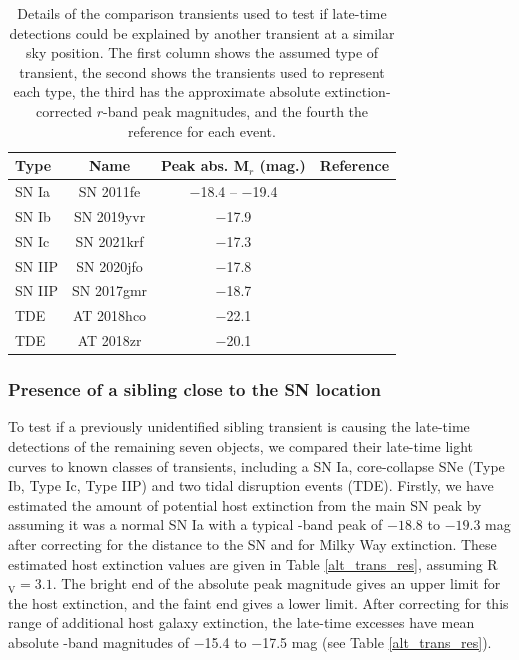 \documentclass[a4paper,oneside,12pt, class=Latex/Classes/PhDthesisPSnPDF, crop=false]{standalone}
\begin{document}
\begin{table}
 \centering
 \caption{
 Details of the comparison transients used to test if late-time detections could be explained by another transient at a similar sky position. The first column shows the assumed type of transient, the second shows the transients used to represent each type, the third has the approximate absolute extinction-corrected $r$-band peak magnitudes, and the fourth the reference for each event.}
 \begin{tabular}{lccc}
  \hline
   Type & Name & Peak abs. M$_{r}$ (mag.) & Reference\\
   \hline
   SN Ia & SN 2011fe & $-$18.4 -- $-$19.4 & \citet{spec_HST}\\
   SN Ib & SN 2019yvr & $-$17.9 & \citet{Ib_ex}\\
   SN Ic & SN 2021krf & $-$17.3 & \citet{21krf_ext}\\
   SN IIP & SN 2020jfo & $-$17.8 & \citet{IIp_ext}\\
   SN IIP & SN 2017gmr & $-$18.7 & \citet{2017gmr}\\
   TDE & AT 2018hco & $-$22.1 & \citet{TDE_ext}\\
   TDE & AT 2018zr & $-$20.1 & \citet{TDE_ext}\\
   \hline
 \end{tabular}
 \label{alt_trans}
\end{table} 

\subsubsection{Presence of a sibling close to the SN location}
To test if a previously unidentified sibling transient is causing the late-time detections of the remaining seven objects, we compared their late-time light curves to known classes of transients, including a SN Ia, core-collapse SNe (Type Ib, Type Ic, Type IIP) and two tidal disruption events (TDE). Firstly, we have estimated the amount of potential host extinction from the main SN peak by assuming it was a normal SN Ia with a typical \ztfg-band peak of $-18.8$ to $-19.3$ mag after correcting for the distance to the SN and for Milky Way extinction. These estimated host extinction values are given in Table \ref{alt_trans_res}, assuming R$_\text{V} = 3.1$. The bright end of the absolute peak magnitude gives an upper limit for the host extinction, and the faint end gives a lower limit. After correcting for this range of additional host galaxy extinction, the late-time excesses have mean absolute \ztfr-band magnitudes of $-$15.4 to $-$17.5 mag (see Table \ref{alt_trans_res}). 
\end{document}
